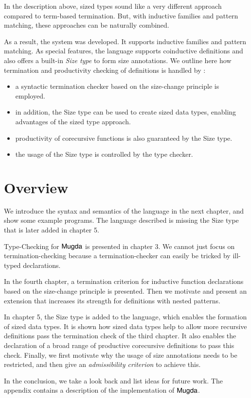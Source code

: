 In the description above, sized types sound like a very different approach compared to term-based termination.
But, with inductive families and pattern matching, these approaches can be naturally combined.

As a result, the system \mugda was developed.
It supports inductive families and pattern matching.
As special features, the language supports coinductive definitions and also offers a built-in \emph{Size type} to form size annotations.
We outline here how termination and productivity checking of definitions is handled by \mugda:
\begin{itemize}
\item
a syntactic termination checker based on the size-change principle is employed.
\item
in addition, the Size type can be used to create sized data types, enabling advantages of the
sized type approach.
\item
productivity of corecursive functions is also guaranteed by the Size type.
\item
the usage of the Size type is controlled by the type checker.
\end{itemize}
\section{Overview}
We introduce the syntax and semantics of the \mugda language in the next chapter, and show some example programs.
The language described is missing the Size type that is later added in chapter 5.

Type-Checking for $\textsf{Mugda}$ is presented in chapter 3.
We cannot just focus on termination-checking because a termination-checker can easily be tricked by ill-typed declarations.

In the fourth chapter, a termination criterion for inductive function declarations based on the size-change principle is presented. Then we motivate and present an extension that increases its strength for definitions with nested patterns.

In chapter 5, the Size type is added to the language, which enables the formation of sized data types. It is shown how sized data types help to allow more recursive definitions pass the termination check of the third chapter.
It also enables the declaration of a broad range of productive corecursive definitions to pass this check.
Finally, we first motivate why the usage of size annotations needs to be restricted, and then give an \emph{admissibility criterion} to achieve this.

In the conclusion, we take a look back and list ideas for future work. The appendix contains a description of the implementation of $\textsf{Mugda}$.

